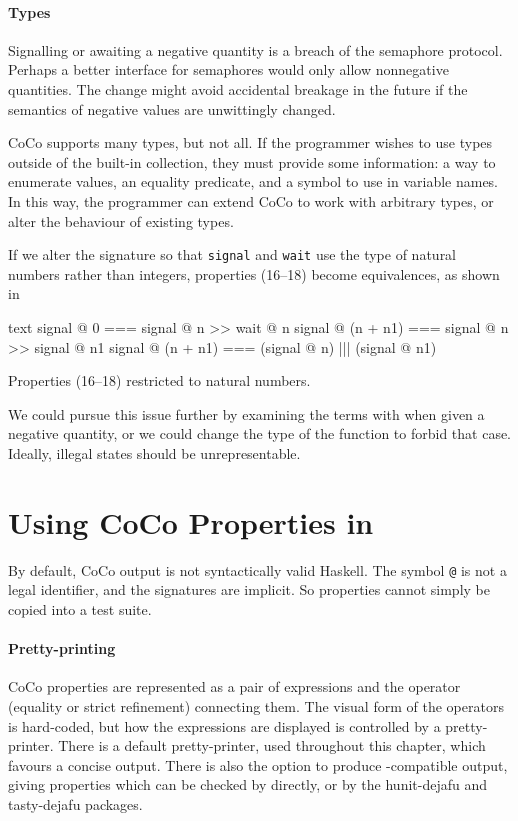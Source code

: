 \paragraph{Types}
Signalling or awaiting a negative quantity is a breach of the
semaphore protocol.  Perhaps a better interface for semaphores would
only allow nonnegative quantities.  The change might avoid accidental
breakage in the future if the semantics of negative values are
unwittingly changed.

CoCo supports many types, but not all.  If the programmer wishes to
use types outside of the built-in collection, they must provide some
information: a way to enumerate values, an equality predicate, and a
symbol to use in variable names.  In this way, the programmer can
extend CoCo to work with arbitrary types, or alter the behaviour of
existing types.

If we alter the signature so that \verb|signal| and \verb|wait| use
the type of natural numbers rather than integers, properties (16--18)
become equivalences, as shown in 

\begin{listing}
\centering
\begin{cminted}{text}
       signal @ 0  ===  signal @ n >> wait @ n
signal @ (n + n1)  ===  signal @ n >> signal @ n1
signal @ (n + n1)  ===  (signal @ n) ||| (signal @ n1)
\end{cminted}
\caption{Properties (16--18) restricted to natural numbers.}\label{lst:sem4}
\end{listing}

We could pursue this issue further by examining the terms with
\dejafu{} when given a negative quantity, or we could change the type
of the function to forbid that case.  Ideally, illegal states should
be unrepresentable.

\section{Using CoCo Properties in \dejafu{}}
\label{sec:coco-dejafu}

By default, CoCo output is not syntactically valid Haskell.  The
symbol \texttt{@} is not a legal identifier, and the signatures are
implicit.  So properties cannot simply be copied into a test suite.

\paragraph{Pretty-printing}
CoCo properties are represented as a pair of expressions and the
operator (equality or strict refinement) connecting them.  The visual
form of the operators is hard-coded, but how the expressions are
displayed is controlled by a pretty-printer.  There is a default
pretty-printer, used throughout this chapter, which favours a concise
output.  There is also the option to produce \dejafu{}-compatible
output, giving properties which can be checked by \dejafu{} directly,
or by the hunit-dejafu \parencite{hunit_dejafu} and
tasty-dejafu \parencite{tasty_dejafu} packages.

